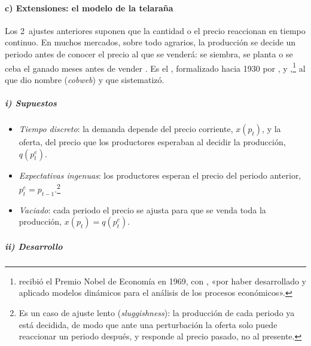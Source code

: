 \documentclass[11pt]{article}
\begin{document}
\paragraph{c) Extensiones: el modelo de la telaraña}

Los 2~ajustes anteriores suponen que la cantidad o el precio reaccionan en tiempo continuo. En muchos mercados, sobre todo agrarios, la producción se decide un periodo antes de conocer el precio al que se venderá: se siembra, se planta o se ceba el ganado meses antes de vender . Es el , formalizado hacia 1930 por ,  y ,\footnote{ recibió el Premio Nobel de Economía en 1969, con , «por haber desarrollado y aplicado modelos dinámicos para el análisis de los procesos económicos»\nocite{Nobel1969}.} al que \textcite{Kaldor1934Classificatory} dio nombre (\emph{cobweb}) y que \textcite{Ezekiel1938Cobweb} sistematizó.

\subparagraph{i) Supuestos}

\begin{itemize}
\item \emph{Tiempo discreto}: la demanda depende del precio corriente, $x(p_t)$, y la oferta, del precio que los productores esperaban al decidir la producción, $q(p^e_t)$.
\item \emph{Expectativas ingenuas}: los productores esperan el precio del periodo anterior, $p^e_t=p_{t-1}$.\footnote{Es un caso de ajuste lento (\emph{sluggishness}): la producción de cada periodo ya está decidida, de modo que ante una perturbación la oferta solo puede reaccionar un periodo después, y responde al precio pasado, no al presente.}
\item \emph{Vaciado}: cada periodo el precio se ajusta para que se venda toda la producción, $x(p_t)=q(p^e_t)$.
\end{itemize}

\subparagraph{ii) Desarrollo}
\end{document}
